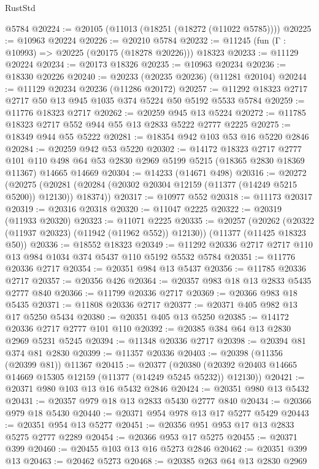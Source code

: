 \begin{lexlean}{RustStd}
\begin{coremodule}
    @5784
@20224 := @20105 (@11013 (@18251 (@18272 (@11022 @5785))))
@20225 := @10963 @20224
@20226 := @20210 @5784
@20232 := @11245 (fun (Γ : @10993) => @20225 (@20175 (@18278 @20226))) @18323
@20233 := @11129 @20224
@20234 := @20173 @18326
@20235 := @10963 @20234
@20236 := @18330 @20226
@20240 := @20233 (@20235 @20236) (@11281 @20104)
@20244 := @11129 @20234 @20236 (@11286 @20172)
@20257 := @11292 @18323 @2717 @2717 @50 @13 @945 @1035 @374 @5224 @50 @5192 @5533 @5784
@20259 := @11776 @18323 @2717
@20262 := @20259 @945 @13 @5224
@20272 := @11785 @18323 @2717 @552 @944 @55 @13 @2833 @5222 @2777 @2225
@20275 := @18349 @944 @55 @5222
@20281 := @18354 @942 @103 @53 @16 @5220 @2846
@20284 := @20259 @942 @53 @5220
@20302 := @14172
    @18323
    @2717
    @2777
    @101
    @110
    @498
    @64
    @53
    @2830
    @2969
    @5199
    @5215
    (@18365 @2830 @18369 @11367)
    @14665
    @14669
@20304 := @14233 (@14671 @498)
@20316 := @20272
    (@20275 (@20281 (@20284 (@20302 @20304 @12159 (@11377 (@14249 @5215 @5200)) @12130)) @18374))
@20317 := @10977 @552
@20318 := @11173 @20317
@20319 := @20316 @20318
@20320 := @11047 @2225
@20322 := @20319 (@11933 @20320)
@20323 := @11071 @2225
@20335 := @20257
    (@20262 (@20322 (@11937 @20323) (@11942 (@11962 @552)) @12130))
    (@11377 (@11425 @18323 @50))
@20336 := @18552 @18323
@20349 := @11292 @20336 @2717 @2717 @110 @13 @984 @1034 @374 @5437 @110 @5192 @5532 @5784
@20351 := @11776 @20336 @2717
@20354 := @20351 @984 @13 @5437
@20356 := @11785 @20336 @2717
@20357 := @20356 @426
@20364 := @20357 @983 @18 @13 @2833 @5435 @2777 @840
@20366 := @11799 @20336 @2717
@20369 := @20366 @983 @18 @5435
@20371 := @11808 @20336 @2717
@20377 := @20371 @405 @982 @13 @17 @5250 @5434
@20380 := @20351 @405 @13 @5250
@20385 := @14172 @20336 @2717 @2777 @101 @110
@20392 := @20385 @384 @64 @13 @2830 @2969 @5231 @5245
@20394 := @11348 @20336 @2717
@20398 := @20394 @81 @374 @81 @2830
@20399 := @11357 @20336
@20403 := @20398 (@11356 (@20399 @81)) @11367
@20415 := @20377
    (@20380 (@20392 @20403 @14665 @14669 @15305 @12159 (@11377 (@14249 @5245 @5232)) @12130))
@20421 := @20371 @980 @103 @13 @16 @5432 @2846
@20424 := @20351 @980 @13 @5432
@20431 := @20357 @979 @18 @13 @2833 @5430 @2777 @840
@20434 := @20366 @979 @18 @5430
@20440 := @20371 @954 @978 @13 @17 @5277 @5429
@20443 := @20351 @954 @13 @5277
@20451 := @20356 @951 @953 @17 @13 @2833 @5275 @2777 @2289
@20454 := @20366 @953 @17 @5275
@20455 := @20371 @399
@20460 := @20455 @103 @13 @16 @5273 @2846
@20462 := @20351 @399 @13
@20463 := @20462 @5273
@20468 := @20385 @263 @64 @13 @2830 @2969

\end{coremodule}
\end{lexlean}
